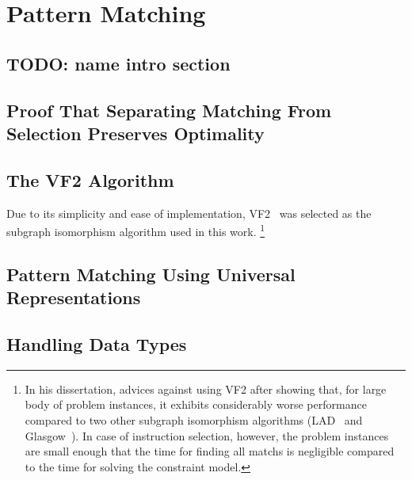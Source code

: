 %

\chapter{Pattern Matching}




\section{TODO: name intro section}




\section{Proof That Separating Matching From Selection Preserves Optimality}



\section{The VF2 Algorithm}

Due to its simplicity and ease of implementation,
\gls{VF2}~\cite{CordellaEtAl:2001} was selected as the \gls{subgraph
  isomorphism} algorithm used in this work.\!%
%
\footnote{%
  In his dissertation, \textcite{McCreesh:2017} advices against using \gls{VF2}
  after showing that, for large body of problem instances, it exhibits
  considerably worse performance compared to two other \gls{subgraph
    isomorphism} algorithms (\gls{LAD}~\cite{Solnon:2010} and
  Glasgow~\cite{McCreeshProsser:2015}).
  In case of \gls{instruction selection}, however, the problem instances are
  small enough that the time for finding all \glspl{match} is negligible
  compared to the time for solving the \gls{constraint model}.
}
%



\section{Pattern Matching Using Universal Representations}





\section{Handling Data Types}

